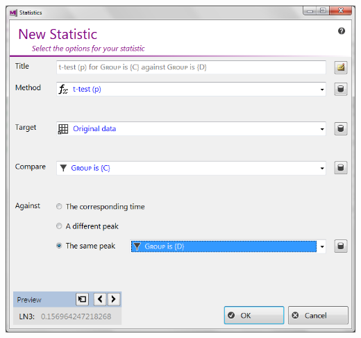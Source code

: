 \documentclass[11pt,a4paper]{article}
\begin{document}
\begin{center}
	\includegraphics[max width=0.7\linewidth]{"Images/userguide/new statistic"}
\end{center}
\end{document}

